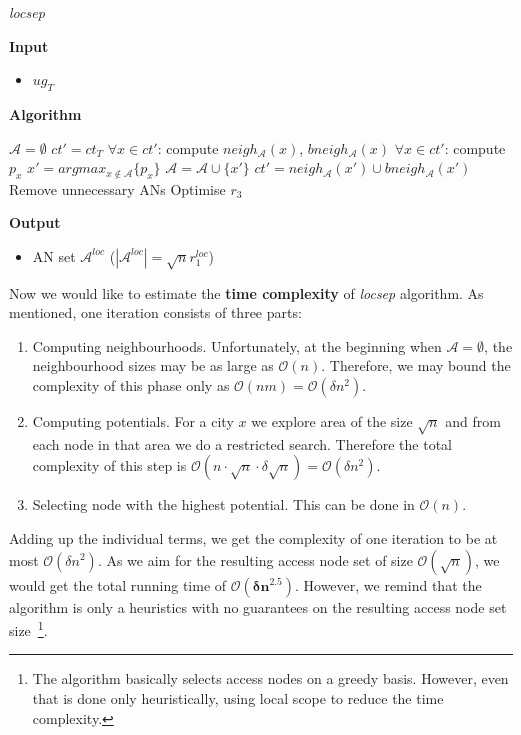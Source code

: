 		\color{algcolor}
		\begin{algorithm}[H]
			\color{inalgcolor}
			\caption{\textit{locsep}}
			\label{alg:locsep}
			\textbf{Input} 
			\begin{itemize}
				\item $ug_{T}$
			\end{itemize}
			\textbf{Algorithm}
			\begin{algorithmic}[1]
				\STATE $\mathcal{A} = \emptyset$
				\STATE $ct' = ct_{T}$
					\STATE $\forall x \in ct'$: compute $neigh_{\mathcal{A}}(x)$, $bneigh_{\mathcal{A}}(x)$
					\STATE $\forall x \in ct'$: compute $p_{x}$
					\STATE $x' = argmax_{x \not \in \mathcal{A}} \{p_{x}\}$
					\STATE $\mathcal{A} = \mathcal{A} \cup \{x'\}$
					\STATE $ct' = neigh_{\mathcal{A}}(x') \cup bneigh_{\mathcal{A}}(x')$
				\ENDWHILE
				\STATE Remove unnecessary ANs
				\STATE Optimise $r_{3}$
			\end{algorithmic}
			\textbf{Output}
			\begin{itemize}
				\item AN set $\mathcal{A}^{loc}$ ($|\mathcal{A}^{loc}| = \sqrt{n} r^{loc}_{1}$)
			\end{itemize}
		\end{algorithm}
		\color{black}
		
		\noindent Now we would like to estimate the \textbf{time complexity} of \textit{locsep} algorithm. As mentioned, one iteration consists of three parts:
		\begin{enumerate}
			\item Computing neighbourhoods. Unfortunately, at the beginning when $\mathcal{A} = \emptyset$, the neighbourhood sizes may be as large as $\mathcal{O}(n)$. Therefore, we may bound the complexity of this phase only as $\mathcal{O}(nm) = \mathcal{O}(\delta n^{2})$.
			\item Computing potentials. For a city $x$ we explore area of the size $\sqrt{n}$ and from each node in that area we do a restricted search. Therefore the total complexity of this step is $\mathcal{O}(n \cdot \sqrt{n} \cdot \delta \sqrt{n}) = \mathcal{O}(\delta n^{2})$.
			\item Selecting node with the highest potential. This can be done in $\mathcal{O}(n)$.
		\end{enumerate}
		\hspace*{\fill}
		
		\noindent Adding up the individual terms, we get the complexity of one iteration to be at most $\mathcal{O}(\delta n^{2})$. As we aim for the resulting access node set of size $\mathcal{O}(\sqrt{n})$, we would get the total running time of $\bm{\mathcal{O}(\delta n^{2.5})}$. However, we remind that the algorithm is only a heuristics with no guarantees on the resulting access node set size~\footnote{The algorithm basically selects access nodes on a greedy basis. However, even that is done only heuristically, using local scope to reduce the time complexity.}.
		
